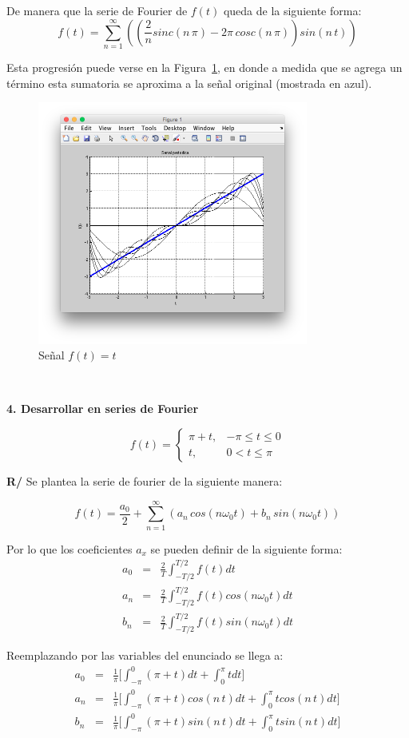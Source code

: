 \documentclass[twocolumn]{article}
\begin{document}
De manera que la serie de Fourier de $f(t)$ queda de la siguiente forma:
$$f(t) = \sum_{n=1}^\infty\left(\left(\frac{2}{n}sinc(n\,\pi) -2\pi\,cosc(n\,\pi)\right)sin(n\,t)\right)$$

Esta progresión puede verse en la Figura~\ref{fig_3}, en donde a medida que se agrega un término esta sumatoria se aproxima a la señal original (mostrada en azul).

\begin{figure}[!t]
\centering
\includegraphics[width=3.5in]{imgs/lin.png}
\caption{Señal $f(t) = t$}
\label{fig_3}
\end{figure}

$\,$

\textbf{4. Desarrollar en series de Fourier}

$$f(t) = \begin{cases}
\pi +t, &-\pi \leq t \leq 0\\
t, &0 < t \leq \pi
\end{cases}$$

\textbf{R/} Se plantea la serie de fourier de la siguiente manera:

$$f(t) = \frac{a_0}{2} + \sum_{n=1}^\infty\left(a_n\,cos(n\omega_0t) + b_n\,sin(n\omega_0t)\right)$$

Por lo que los coeficientes $a_x$ se pueden definir de la siguiente forma:
\begin{eqnarray*}
a_0 &=& \frac{2}{T}\int_{-T/2}^{T/2}f(t)dt\\
a_n &=& \frac{2}{T}\int_{-T/2}^{T/2}f(t)cos(n\omega_0t)dt\\
b_n &=& \frac{2}{T}\int_{-T/2}^{T/2}f(t)sin(n\omega_0t)dt
\end{eqnarray*}

Reemplazando por las variables del enunciado se llega a:
\begin{eqnarray*}
a_0 &=& \frac{1}{\pi} \bigg[ \int_{-\pi}^{0}(\pi + t) dt + \int_{0}^{\pi}t dt \bigg] \\
a_n &=&\frac{1}{\pi} \bigg[ \int_{-\pi}^{0}(\pi + t)cos(n\,t) dt + \int_{0}^{\pi}tcos(n\,t) dt \bigg] \\
b_n &=& \frac{1}{\pi} \bigg[ \int_{-\pi}^{0}(\pi + t)sin(n\,t) dt + \int_{0}^{\pi}tsin(n\,t) dt \bigg]
\end{eqnarray*}
\end{document}
